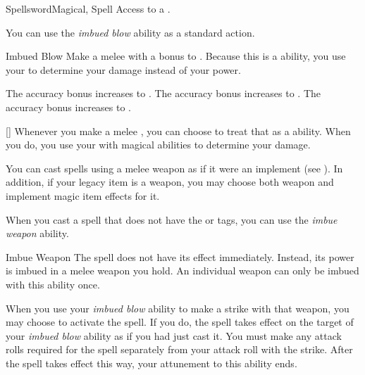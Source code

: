     \begin{feat}{Spellsword}{Magical, Spell}
        \featpre Access to a .

         You can use the \textit{imbued blow} ability as a standard action.
        \begin{freeability}{Imbued Blow}
            \rankline
            Make a melee  with a  bonus to .
            Because this is a  ability, you use your   to determine your damage instead of your  power.

            \rankline
             The accuracy bonus increases to .
             The accuracy bonus increases to .
             The accuracy bonus increases to .
        \end{freeability}

        [] Whenever you make a melee , you can choose to treat that as a  ability.
        When you do, you use your  with magical abilities to determine your damage.

         You can cast spells using a melee weapon as if it were an implement (see ).
        In addition, if your legacy item is a weapon, you may choose both weapon and implement magic item effects for it.

         When you cast a spell that does not have the  or  tags,
            you can use the \textit{imbue weapon} ability.
        \begin{attuneability}{Imbue Weapon}
            \rankline
            The spell does not have its effect immediately.
            Instead, its power is imbued in a melee weapon you hold.
            An individual weapon can only be imbued with this ability once.

            When you use your \textit{imbued blow} ability to make a strike with that weapon, you may choose to activate the spell.
            If you do, the spell takes effect on the target of your \textit{imbued blow} ability as if you had just cast it.
            You must make any attack rolls required for the spell separately from your attack roll with the strike.
            After the spell takes effect this way, your attunement to this ability ends.
        \end{attuneability}


\end{feat}
